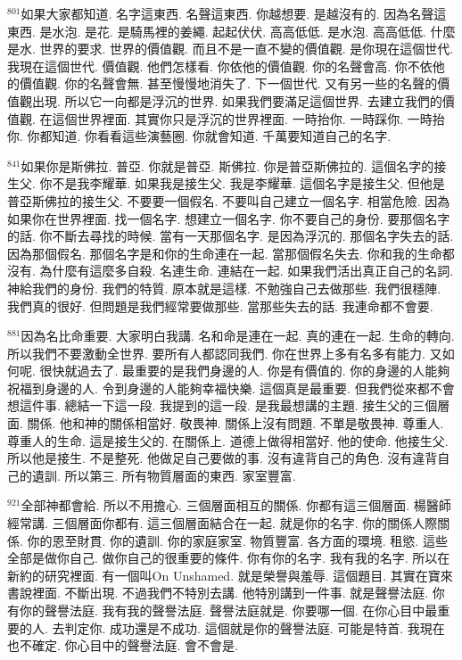 \documentclass{book}
\begin{document}
$^{801}$如果大家都知道.
名字這東西.
名聲這東西.
你越想要.
是越沒有的.
因為名聲這東西.
是水泡.
是花.
是騎馬裡的姜繩.
起起伏伏.
高高低低.
是水泡.
高高低低.
什麼是水.
世界的要求.
世界的價值觀.
而且不是一直不變的價值觀.
是你現在這個世代.
我現在這個世代.
價值觀.
他們怎樣看.
你依他的價值觀.
你的名聲會高.
你不依他的價值觀.
你的名聲會無.
甚至慢慢地消失了.
下一個世代.
又有另一些的名聲的價值觀出現.
所以它一向都是浮沉的世界.
如果我們要滿足這個世界.
去建立我們的價值觀.
在這個世界裡面.
其實你只是浮沉的世界裡面.
一時抬你.
一時踩你.
一時抬你.
你都知道.
你看看這些演藝圈.
你就會知道.
千萬要知道自己的名字.

$^{841}$如果你是斯佛拉.
普亞.
你就是普亞.
斯佛拉.
你是普亞斯佛拉的.
這個名字的接生父.
你不是我李耀華.
如果我是接生父.
我是李耀華.
這個名字是接生父.
但他是普亞斯佛拉的接生父.
不要要一個假名.
不要叫自己建立一個名字.
相當危險.
因為如果你在世界裡面.
找一個名字.
想建立一個名字.
你不要自己的身份.
要那個名字的話.
你不斷去尋找的時候.
當有一天那個名字.
是因為浮沉的.
那個名字失去的話.
因為那個假名.
那個名字是和你的生命連在一起.
當那個假名失去.
你和我的生命都沒有.
為什麼有這麼多自殺.
名連生命.
連結在一起.
如果我們活出真正自己的名詞.
神給我們的身份.
我們的特質.
原本就是這樣.
不勉強自己去做那些.
我們很穩陣.
我們真的很好.
但問題是我們經常要做那些.
當那些失去的話.
我連命都不會要.

$^{881}$因為名比命重要.
大家明白我講.
名和命是連在一起.
真的連在一起.
生命的轉向.
所以我們不要激動全世界.
要所有人都認同我們.
你在世界上多有名多有能力.
又如何呢.
很快就過去了.
最重要的是我們身邊的人.
你是有價值的.
你的身邊的人能夠祝福到身邊的人.
令到身邊的人能夠幸福快樂.
這個真是最重要.
但我們從來都不會想這件事.
總結一下這一段.
我提到的這一段.
是我最想講的主題.
接生父的三個層面.
關係.
他和神的關係相當好.
敬畏神.
關係上沒有問題.
不單是敬畏神.
尊重人.
尊重人的生命.
這是接生父的.
在關係上.
道德上做得相當好.
他的使命.
他接生父.
所以他是接生.
不是整死.
他做足自己要做的事.
沒有違背自己的角色.
沒有違背自己的遺訓.
所以第三.
所有物質層面的東西.
家室豐富.

$^{921}$全部神都會給.
所以不用擔心.
三個層面相互的關係.
你都有這三個層面.
楊醫師經常講.
三個層面你都有.
這三個層面結合在一起.
就是你的名字.
你的關係人際關係.
你的恩至財貫.
你的遺訓.
你的家庭家室.
物質豐富.
各方面的環境.
租慾.
這些全部是做你自己.
做你自己的很重要的條件.
你有你的名字.
我有我的名字.
所以在新約的研究裡面.
有一個叫On Unshamed.
就是榮譽與羞辱.
這個題目.
其實在寶來書說裡面.
不斷出現.
不過我們不特別去講.
他特別講到一件事.
就是聲譽法庭.
你有你的聲譽法庭.
我有我的聲譽法庭.
聲譽法庭就是.
你要哪一個.
在你心目中最重要的人.
去判定你.
成功還是不成功.
這個就是你的聲譽法庭.
可能是特首.
我現在也不確定.
你心目中的聲譽法庭.
會不會是.
\end{document}
